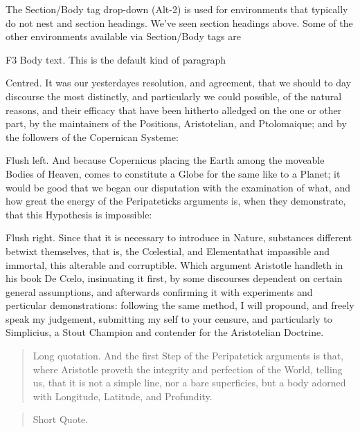 The Section/Body tag drop-down (Alt-2) is used for environments that
typically do not nest and section headings. We've seen section headings
above. Some of the other environments available via Section/Body tags are

F3 Body text. This is the default kind of paragraph

\begin{center}
Centred. It was our yesterdayes resolution, and agreement, that we should to
day discourse the most distinctly, and particularly we could possible, of
the natural reasons, and their efficacy that have been hitherto alledged on
the one or other part, by the maintainers of the Positions, Aristotelian,
and Ptolomaique; and by the followers of the Copernican Systeme:
\end{center}

\begin{flushleft}
Flush left. And because Copernicus placing the Earth among the moveable
Bodies of Heaven, comes to constitute a Globe for the same like to a Planet;
it would be good that we began our disputation with the examination of what,
and how great the energy of the Peripateticks arguments is, when they
demonstrate, that this Hypothesis is impossible:
\end{flushleft}

\begin{flushright}
Flush right. Since that it is necessary to introduce in Nature, substances
different betwixt themselves, that is, the C\oe lestial, and Elementathat
impassible and immortal, this alterable and corruptible. Which argument
Aristotle handleth in his book De C\oe lo, insinuating it first, by some
discourses dependent on certain general assumptions, and afterwards
confirming it with experiments and perticular demonstrations: following the
same method, I will propound, and freely speak my judgement, submitting my
self to your censure, and particularly to Simplicius, a Stout Champion and
contender for the Aristotelian Doctrine.
\end{flushright}

\begin{quotation}
Long quotation. And the first Step of the Peripatetick arguments is that,
where Aristotle proveth the integrity and perfection of the World, telling
us, that it is not a simple line, nor a bare superficies, but a body adorned
with Longitude, Latitude, and Profundity.
\end{quotation}

\begin{quote}
Short Quote.
\end{quote}

